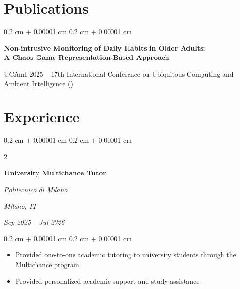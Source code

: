\documentclass[10pt, letterpaper]{article}
\newenvironment{highlights}{
    \begin{itemize}[
        topsep=0.10 cm,
        parsep=0.10 cm,
        partopsep=0pt,
        itemsep=0pt,
        leftmargin=0.4 cm + 10pt
    ]
}{
    \end{itemize}
} %
\newenvironment{onecolentry}{
    \begin{adjustwidth}{
        0.2 cm + 0.00001 cm
    }{
        0.2 cm + 0.00001 cm
    }
}{
    \end{adjustwidth}
} %
\newenvironment{twocolentry}[2][]{
    \onecolentry
    \def\secondColumn{#2}
    \setcolumnwidth{\fill, 4.5 cm}
    \begin{paracol}{2}
}{
    \switchcolumn \raggedleft \secondColumn
    \end{paracol}
    \endonecolentry
} %
\let\hrefWithoutArrow\href
\renewcommand{\href}[2]{\hrefWithoutArrow{#1}{\ifthenelse{\equal{#2}{}}{ }{#2 }\raisebox{.15ex}{\footnotesize \faExternalLink*}}}
\begin{document}

\section{\mbox{{\color{black}\footnotesize\faBook}\hspace*{0.13cm}Publications}}

\begin{onecolentry}
\textbf{Non-intrusive Monitoring of Daily Habits in Older Adults: \\ A Chaos Game Representation-Based Approach}

UCAmI 2025 -- 17th International Conference on Ubiquitous Computing and Ambient Intelligence (\href{https://doi.org/10.1007/978-3-032-16992-1_20}{DOI})
\end{onecolentry}

\section{\mbox{{\color{black}\footnotesize\faShoePrints}\hspace*{0.13cm}Experience}}

    \begin{twocolentry}{
    \textit{Milano, IT}    
            
    \textit{Sep 2025 – Jul 2026}}
    \textbf{University Multichance Tutor}
            
    \textit{Politecnico di Milano}
    \end{twocolentry}
    \vspace{0.10 cm}
    \begin{onecolentry}
    \begin{highlights}
        \item Provided one-to-one academic tutoring to university students through the Multichance program
        \item Provided personalized academic support and study assistance
    \end{highlights}
    \end{onecolentry}

\vspace{0.20 cm}
\end{document}
